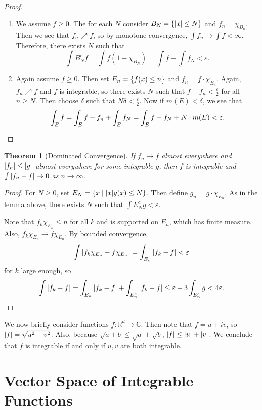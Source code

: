 \documentclass[leqno, openany]{memoir}
\newtheorem{thm}{Theorem}[chapter]
\theoremstyle{definition}
\theoremstyle{remark}
\theoremstyle{plain}
\theoremstyle{definition}
\theoremstyle{remark}
\newcommand{\R}{\mathbb{R}}
\renewcommand{\C}{\mathbb{C}}
\newcommand{\ep}{\varepsilon}
\begin{document}
\begin{proof}
    \begin{enumerate}
        \item We assume $f \geq 0$. The for each $N$ consider $B_N = \qty{\abs{x} \leq N}$ and $f_n = \chi_{B_n}$. Then we see that $f_n \nearrow f$, so by monotone convergence, $\int f_n \to \int f < \infty$. Therefore, there exists $N$ such that
            \[ \int B_N^c f = \int f(1-\chi_{B_N}) = \int f - \int f_N < \ep. \]
        \item Again assume $f \geq 0$. Then set $E_n = \qty{f(x) \leq n}$ and $f_n = f \cdot \chi_{E_n}$. Again, $f_n \nearrow f$ and $f$ is integrable, so there exists $N$ such that $f- f_n < \frac{\ep}{2}$ for all $n \geq N$. Then choose $\delta$ such that $N \delta < \frac{\ep}{2}$. Now if $m(E) < \delta$, we see that
            \[ \int_E f = \int_E f-f_n + \int_E f_N = \int_E f-f_N + N \cdot m(E) < \ep. \qedhere \]
    \end{enumerate}
\end{proof}

\begin{thm}[Dominated Convergence]
    If $f_n \to f$ almost everywhere and $\abs{f_n} \leq \abs{g}$ almost everywhere for some integrable $g$, then $f$ is integrable and $\int \abs{f_n - f} \to 0$ as $n \to \infty$.
\end{thm}

\begin{proof}
    For $N \geq 0$, set $E_N = \qty{ x \mid \abs{x} g(x) \leq N }$. Then define $g_n = g \cdot \chi_{E_n}$. As in the lemma above, there exists $N$ such that $\int E_N^c g < \ep$.

    Note that $f_k \chi_{E_n} \leq n$ for all $k$ and is supported on $E_n$, which has finite measure. Also, $f_k \chi_{E_n} \to f \chi_{E_n}$. By bounded convergence, 
    \[ \int \abs{f_k \chi_{E_n} - f \chi_{E_n}} = \int_{E_n} \abs{f_k - f} < \ep \]
    for $k$ large enough, so
    \[ \int \abs{f_k - f} = \int_{E_n} \abs{f_k - f} + \int_{E_n^c} \abs{f_k - f} \leq \ep + 3 \int_{E_n^c} g < 4 \ep. \qedhere \]
\end{proof}

We now briefly consider functions $f: \R^d \to \C$. Then note that $f = u+iv$, so $\abs{f} = \sqrt{u^2 + v^2}$. Also, because $\sqrt{a+b} \leq \sqrt{a} + \sqrt{b}$, $\abs{f} \leq \abs{u} + \abs{v}$. We conclude that $f$ is integrable if and only if $u,v$ are both integrable.

\section{Vector Space of Integrable Functions}%
\label{sec:vector_space_of_integrable_functions}
\end{document}
